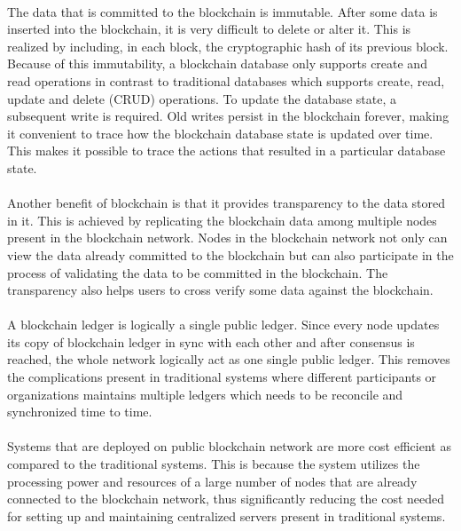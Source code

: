 \documentclass{article}
\begin{document}
        \paragraph{}
        The data that is committed to the blockchain is immutable. After some data is inserted into the blockchain, it is very difficult to delete or alter it. This is realized by including, in each block, the cryptographic hash of its previous block. Because of this immutability, a blockchain database only supports create and read operations in contrast to traditional databases which supports create, read, update and delete (CRUD) operations. To update the database state, a subsequent write is required. Old writes persist in the blockchain forever, making it convenient to trace how the blockchain database state is updated over time. This makes it possible to trace the actions that resulted in a particular database state.

        \paragraph{}
        Another benefit of blockchain is that it provides transparency to the data stored in it. This is achieved by replicating the blockchain data among multiple nodes present in the blockchain network. Nodes in the blockchain network not only can view the data already committed to the blockchain but can also participate in the process of validating the data to be committed in the blockchain. The transparency also helps users to cross verify some data against the blockchain.  

        \paragraph{}
        A blockchain ledger is logically a single public ledger. Since every node updates its copy of blockchain ledger in sync with each other and after consensus is reached, the whole network logically act as one single public ledger. This removes the complications present in traditional systems where different participants or organizations maintains multiple ledgers which needs to be reconcile and synchronized time to time.

        \paragraph{}
        Systems that are deployed on public blockchain network are more cost efficient as compared to the traditional systems. This is because the system utilizes the processing power and resources of a large number of nodes that are already connected to the blockchain network, thus significantly reducing the cost needed for setting up and maintaining centralized servers present in traditional systems.
\end{document}

